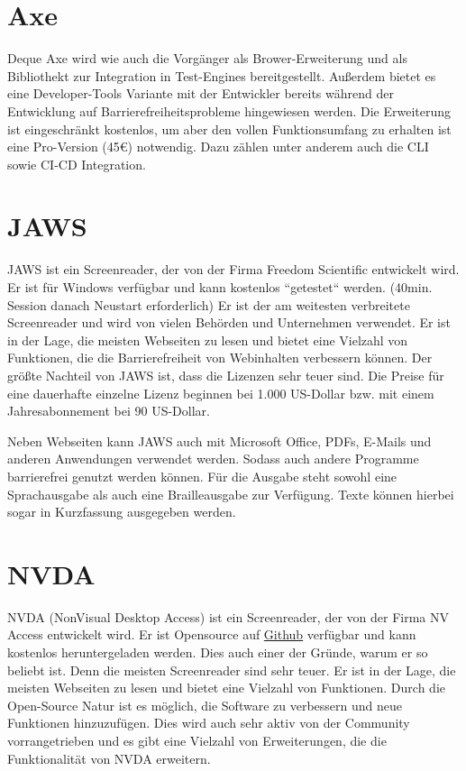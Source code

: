 \section{Axe}
\label{sec:a11yToolsAxe}

Deque Axe wird wie auch die Vorgänger als Brower-Erweiterung und als Bibliothekt zur Integration in Test-Engines bereitgestellt. Außerdem bietet es eine Developer-Tools Variante mit der Entwickler bereits während der Entwicklung auf Barrierefreiheitsprobleme hingewiesen werden. Die Erweiterung ist eingeschränkt kostenlos, um aber den vollen Funktionsumfang zu erhalten ist eine Pro-Version (45€) notwendig. Dazu zählen unter anderem auch die CLI sowie CI-CD Integration.

\section{JAWS}
\label{sec:a11yToolsJAWS}

JAWS ist ein Screenreader, der von der Firma Freedom Scientific entwickelt wird. Er ist für Windows verfügbar und kann kostenlos ``getestet`` werden. (40min. Session danach Neustart erforderlich) Er ist der am weitesten verbreitete Screenreader und wird von vielen Behörden und Unternehmen verwendet. Er ist in der Lage, die meisten Webseiten zu lesen und bietet eine Vielzahl von Funktionen, die die Barrierefreiheit von Webinhalten verbessern können. Der größte Nachteil von JAWS ist, dass die Lizenzen sehr teuer sind. Die Preise für eine dauerhafte einzelne Lizenz beginnen bei 1.000 US-Dollar bzw. mit einem Jahresabonnement bei 90 US-Dollar.

Neben Webseiten kann JAWS auch mit Microsoft Office, PDFs, E-Mails und anderen Anwendungen verwendet werden. Sodass auch andere Programme barrierefrei genutzt werden können. Für die Ausgabe steht sowohl eine Sprachausgabe als auch eine Brailleausgabe zur Verfügung. Texte können hierbei sogar in Kurzfassung ausgegeben werden.

\section{NVDA}
\label{sec:a11yToolsNVDA}

NVDA (NonVisual Desktop Access) ist ein Screenreader, der von der Firma NV Access entwickelt wird. Er ist Opensource auf \href{https://github.com/nvaccess/nvda/}{Github} verfügbar und kann kostenlos heruntergeladen werden. Dies auch einer der Gründe, warum er so beliebt ist. Denn die meisten Screenreader sind sehr teuer. Er ist in der Lage, die meisten Webseiten zu lesen und bietet eine Vielzahl von Funktionen. Durch die Open-Source Natur ist es möglich, die Software zu verbessern und neue Funktionen hinzuzufügen. Dies wird auch sehr aktiv von der Community vorrangetrieben und es gibt eine Vielzahl von Erweiterungen, die die Funktionalität von NVDA erweitern.